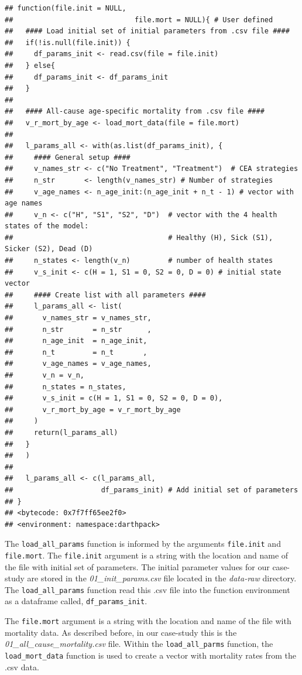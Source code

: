 \documentclass[]{book}
\begin{document}
\begin{verbatim}
## function(file.init = NULL,
##                             file.mort = NULL){ # User defined
##   #### Load initial set of initial parameters from .csv file ####
##   if(!is.null(file.init)) {
##     df_params_init <- read.csv(file = file.init)
##   } else{
##     df_params_init <- df_params_init
##   }
##   
##   #### All-cause age-specific mortality from .csv file ####
##   v_r_mort_by_age <- load_mort_data(file = file.mort)
##   
##   l_params_all <- with(as.list(df_params_init), {
##     #### General setup ####
##     v_names_str <- c("No Treatment", "Treatment")  # CEA strategies
##     n_str       <- length(v_names_str) # Number of strategies
##     v_age_names <- n_age_init:(n_age_init + n_t - 1) # vector with age names
##     v_n <- c("H", "S1", "S2", "D")  # vector with the 4 health states of the model:
##                                     # Healthy (H), Sick (S1), Sicker (S2), Dead (D)
##     n_states <- length(v_n)         # number of health states 
##     v_s_init <- c(H = 1, S1 = 0, S2 = 0, D = 0) # initial state vector
##     #### Create list with all parameters ####
##     l_params_all <- list(
##       v_names_str = v_names_str,
##       n_str       = n_str      ,
##       n_age_init  = n_age_init, 
##       n_t         = n_t       , 
##       v_age_names = v_age_names,
##       v_n = v_n,
##       n_states = n_states,
##       v_s_init = c(H = 1, S1 = 0, S2 = 0, D = 0),
##       v_r_mort_by_age = v_r_mort_by_age
##     )
##     return(l_params_all)
##   }
##   )
##   
##   l_params_all <- c(l_params_all, 
##                     df_params_init) # Add initial set of parameters
## }
## <bytecode: 0x7f7ff65ee2f0>
## <environment: namespace:darthpack>
\end{verbatim}

The \texttt{load\_all\_params} function is informed by the arguments
\texttt{file.init} and \texttt{file.mort}. The \texttt{file.init}
argument is a string with the location and name of the file with initial
set of parameters. The initial parameter values for our case-study are
stored in the \emph{01\_init\_params.csv} file located in the
\emph{data-raw} directory. The \texttt{load\_all\_params} function read
this .csv file into the function environment as a dataframe called,
\texttt{df\_params\_init}.

The \texttt{file.mort} argument is a string with the location and name
of the file with mortality data. As described before, in our case-study
this is the \emph{01\_all\_cause\_mortality.csv} file. Within the
\texttt{load\_all\_parms} function, the \texttt{load\_mort\_data}
function is used to create a vector with mortality rates from the .csv
data.
\end{document}
